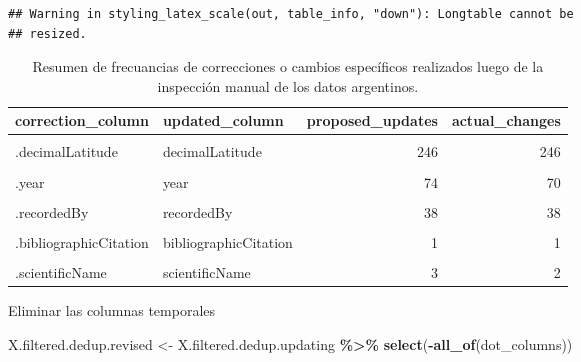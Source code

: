 \documentclass[sn-apa,pdflatex]{sn-jnl}
\newenvironment{Shaded}{\begin{snugshade}}{\end{snugshade}}
\newcommand{\FunctionTok}[1]{\textcolor[rgb]{0.13,0.29,0.53}{\textbf{#1}}}
\newcommand{\NormalTok}[1]{#1}
\newcommand{\OtherTok}[1]{\textcolor[rgb]{0.56,0.35,0.01}{#1}}
\newcommand{\SpecialCharTok}[1]{\textcolor[rgb]{0.81,0.36,0.00}{\textbf{#1}}}
\begin{document}
\begin{verbatim}
## Warning in styling_latex_scale(out, table_info, "down"): Longtable cannot be
## resized.
\end{verbatim}

\begingroup\fontsize{10}{12}\selectfont

\begin{longtable}[t]{llrr}
\caption{\label{tab:unnamed-chunk-204}Resumen de frecuancias de correcciones o cambios específicos realizados luego de la inspección manual de los datos argentinos.}\\
\toprule
\textbf{correction\_column} & \textbf{updated\_column} & \textbf{proposed\_updates} & \textbf{actual\_changes}\\
\midrule
\cellcolor{gray!10}{.locality} & \cellcolor{gray!10}{locality} & \cellcolor{gray!10}{44} & \cellcolor{gray!10}{41}\\
.decimalLatitude & decimalLatitude & 246 & 246\\
\cellcolor{gray!10}{.decimalLongitude} & \cellcolor{gray!10}{decimalLongitude} & \cellcolor{gray!10}{246} & \cellcolor{gray!10}{243}\\
.year & year & 74 & 70\\
\cellcolor{gray!10}{.eventDate} & \cellcolor{gray!10}{eventDate} & \cellcolor{gray!10}{13} & \cellcolor{gray!10}{12}\\
\addlinespace
.recordedBy & recordedBy & 38 & 38\\
\cellcolor{gray!10}{.individualCount} & \cellcolor{gray!10}{individualCount} & \cellcolor{gray!10}{9} & \cellcolor{gray!10}{8}\\
.bibliographicCitation & bibliographicCitation & 1 & 1\\
\cellcolor{gray!10}{.canonicalName} & \cellcolor{gray!10}{canonicalName} & \cellcolor{gray!10}{3} & \cellcolor{gray!10}{2}\\
.scientificName & scientificName & 3 & 2\\
\bottomrule
\end{longtable}
\endgroup{}

Eliminar las columnas temporales

\begin{Shaded}
\begin{Highlighting}[]
\NormalTok{X.filtered.dedup.revised }\OtherTok{\textless{}{-}}\NormalTok{ X.filtered.dedup.updating }\SpecialCharTok{\%\textgreater{}\%}
    \FunctionTok{select}\NormalTok{(}\SpecialCharTok{{-}}\FunctionTok{all\_of}\NormalTok{(dot\_columns))}
\end{Highlighting}
\end{Shaded}
\end{document}
